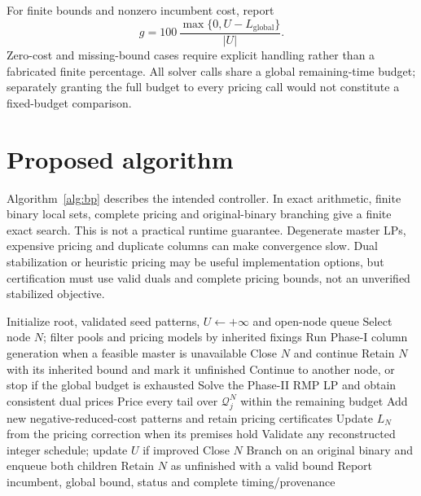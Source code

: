For finite bounds and nonzero incumbent cost, report
\begin{equation}
 g=100\,\frac{\max\{0,U-L_{\mathrm{global}}\}}{|U|}.
 \label{eq:bp_reported_gap}
\end{equation}
Zero-cost and missing-bound cases require explicit handling rather than a
fabricated finite percentage. All solver calls share a global remaining-time
budget; separately granting the full budget to every pricing call would not
constitute a fixed-budget comparison.

\section{Proposed algorithm}
\label{sec:bp_algorithm}

Algorithm~\ref{alg:bp} describes the intended controller. In exact arithmetic,
finite binary local sets, complete pricing and original-binary branching give
a finite exact search. This is not a practical runtime guarantee. Degenerate
master LPs, expensive pricing and duplicate columns can make convergence slow.
Dual stabilization or heuristic pricing may be useful implementation options,
but certification must use valid duals and complete pricing bounds, not an
unverified stabilized objective.

\begin{algorithm}[htbp]
\caption{Proposed full-ABCD branch-and-price controller}
\label{alg:bp}
\begin{algorithmic}[1]
\State Initialize root, validated seed patterns, $U\gets+\infty$ and open-node queue
 \State Select node $N$; filter pools and pricing models by inherited fixings
 \State Run Phase-I column generation when a feasible master is unavailable
  \State Close $N$ and continue
 \EndIf
  \State Retain $N$ with its inherited bound and mark it unfinished
  \State Continue to another node, or stop if the global budget is exhausted
 \EndIf
 \Repeat
  \State Solve the Phase-II RMP LP and obtain consistent dual prices
  \State Price every tail over $\mathcal Q_j^N$ within the remaining budget
  \State Add new negative-reduced-cost patterns and retain pricing certificates
  \State Update $L_N$ from the pricing correction when its premises hold
 \State Validate any reconstructed integer schedule; update $U$ if improved
  \State Close $N$
  \State Branch on an original binary and enqueue both children
 \Else
  \State Retain $N$ as unfinished with a valid bound
 \EndIf
\EndWhile
\State Report incumbent, global bound, status and complete timing/provenance
\end{algorithmic}
\end{algorithm}

